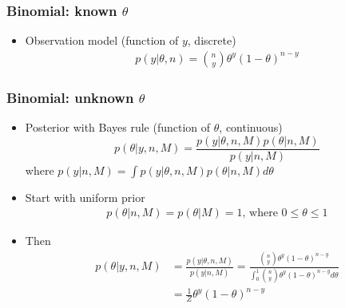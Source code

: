\documentclass[english,t]{beamer}
\begin{document}
\begin{frame}
  \frametitle{Binomial: known $\theta$}

  \begin{itemize}
  \item Observation model (function of $y$, discrete)
    \begin{align*}
      p(y|\theta,n) = \binom{n}{y} \theta^y(1-\theta)^{n-y}
    \end{align*}
  \end{itemize}

  \begin{center}
\end{center}
\end{frame}


\begin{frame}
  \frametitle{Binomial: unknown $\theta$}

  \begin{itemize}
  \item Posterior with Bayes rule (function of $\theta$, continuous)
    \begin{equation*}
      p(\theta|y,n,M)=\frac{p(y|\theta,n,M)p(\theta|n,M)}{p(y|n,M)}
    \end{equation*}
    \pause
    where $p(y|n,M)=\int p(y|\theta,n,M)p(\theta|n,M) d\theta$
  \item<3-> Start with uniform prior
    \begin{align*}
      p(\theta|n,M)=p(\theta|M)=1,\, \text{where}\,\, 0\leq\theta\leq 1
    \end{align*}
  \item<4-> Then
    \begin{align*}
      p(\theta|y,n,M)&=\frac{p(y|\theta,n,M)}{p(y|n,M)} 
      =\frac{\binom{n}{y} \theta^y(1-\theta)^{n-y}}{\int_0^1
        \binom{n}{y} \theta^y(1-\theta)^{n-y} d\theta} \\
        &=\frac{1}{Z}\theta^y(1-\theta)^{n-y}
    \end{align*}
  \end{itemize}

\end{frame}
\end{document}
